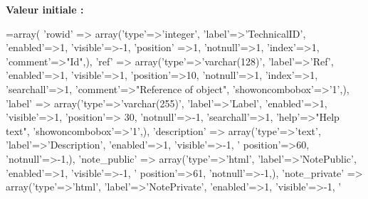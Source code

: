 {\bfseries Valeur initiale \+:}
\begin{DoxyCode}
=array(
        \textcolor{stringliteral}{'rowid'} => array(\textcolor{stringliteral}{'type'}=>\textcolor{stringliteral}{'integer'}, \textcolor{stringliteral}{'label'}=>\textcolor{stringliteral}{'TechnicalID'}, \textcolor{stringliteral}{'enabled'}=>1, \textcolor{stringliteral}{'visible'}=>-1, \textcolor{stringliteral}{'position'}
      =>1, \textcolor{stringliteral}{'notnull'}=>1, \textcolor{stringliteral}{'index'}=>1, \textcolor{stringliteral}{'comment'}=>\textcolor{stringliteral}{"Id"},),
        \textcolor{stringliteral}{'ref'} => array(\textcolor{stringliteral}{'type'}=>\textcolor{stringliteral}{'varchar(128)'}, \textcolor{stringliteral}{'label'}=>\textcolor{stringliteral}{'Ref'}, \textcolor{stringliteral}{'enabled'}=>1, \textcolor{stringliteral}{'visible'}=>1, \textcolor{stringliteral}{'position'}=>10, \textcolor{stringliteral}{
      'notnull'}=>1, \textcolor{stringliteral}{'index'}=>1, \textcolor{stringliteral}{'searchall'}=>1, \textcolor{stringliteral}{'comment'}=>\textcolor{stringliteral}{"Reference of object"}, \textcolor{stringliteral}{'showoncombobox'}=>\textcolor{charliteral}{'1'},),
        \textcolor{stringliteral}{'label'} => array(\textcolor{stringliteral}{'type'}=>\textcolor{stringliteral}{'varchar(255)'}, \textcolor{stringliteral}{'label'}=>\textcolor{stringliteral}{'Label'}, \textcolor{stringliteral}{'enabled'}=>1, \textcolor{stringliteral}{'visible'}=>1, \textcolor{stringliteral}{'position'}=>
      30, \textcolor{stringliteral}{'notnull'}=>-1, \textcolor{stringliteral}{'searchall'}=>1, \textcolor{stringliteral}{'help'}=>\textcolor{stringliteral}{"Help text"}, \textcolor{stringliteral}{'showoncombobox'}=>\textcolor{charliteral}{'1'},),
        \textcolor{stringliteral}{'description'} => array(\textcolor{stringliteral}{'type'}=>\textcolor{stringliteral}{'text'}, \textcolor{stringliteral}{'label'}=>\textcolor{stringliteral}{'Description'}, \textcolor{stringliteral}{'enabled'}=>1, \textcolor{stringliteral}{'visible'}=>-1, \textcolor{stringliteral}{'
      position'}=>60, \textcolor{stringliteral}{'notnull'}=>-1,),
        \textcolor{stringliteral}{'note\_public'} => array(\textcolor{stringliteral}{'type'}=>\textcolor{stringliteral}{'html'}, \textcolor{stringliteral}{'label'}=>\textcolor{stringliteral}{'NotePublic'}, \textcolor{stringliteral}{'enabled'}=>1, \textcolor{stringliteral}{'visible'}=>-1, \textcolor{stringliteral}{'
      position'}=>61, \textcolor{stringliteral}{'notnull'}=>-1,),
        \textcolor{stringliteral}{'note\_private'} => array(\textcolor{stringliteral}{'type'}=>\textcolor{stringliteral}{'html'}, \textcolor{stringliteral}{'label'}=>\textcolor{stringliteral}{'NotePrivate'}, \textcolor{stringliteral}{'enabled'}=>1, \textcolor{stringliteral}{'visible'}=>-1, \textcolor{stringliteral}{'
}
\end{DoxyCode}
